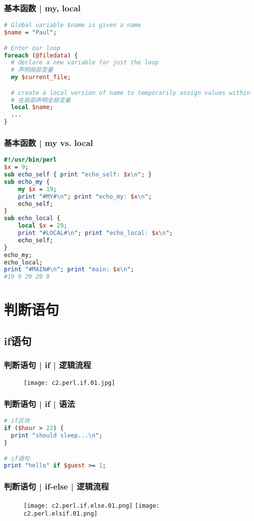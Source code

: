 \begin{frame}[fragile]
  \frametitle{基本函数 | \alert{my}, local}
\begin{lstlisting}[language=Perl]
# Global variable $name is given a name
$name = "Paul";

# Enter our loop
foreach (@filedata) {
  # declare a new variable for just the loop
  # 声明局部变量
  my $current_file;

  # create a local version of name to temporarily assign values within the loop to
  # 在局部声明全局变量
  local $name;
  ...
}
\end{lstlisting}
\end{frame}

\begin{frame}[fragile]
  \frametitle{基本函数 | my vs. local}
\begin{lstlisting}[language=Perl,basicstyle=\small\tt]
#!/usr/bin/perl
$x = 9;
sub echo_self { print "echo_self: $x\n"; }
sub echo_my {
    my $x = 19;
    print "#MY#\n"; print "echo_my: $x\n";
    echo_self;
}
sub echo_local {
    local $x = 29;
    print "#LOCAL#\n"; print "echo_local: $x\n";
    echo_self;
}
echo_my;
echo_local;
print "#MAIN#\n"; print "main: $x\n";
#19 9 29 29 9
\end{lstlisting}
\end{frame}

\section{判断语句}
\subsection{if语句}
\begin{frame}
  \frametitle{判断语句 | if | 逻辑流程}
  \begin{figure}
    \centering
    \texttt{[image: c2.perl.if.01.jpg]}
  \end{figure}
\end{frame}

\begin{frame}[fragile]
  \frametitle{判断语句 | if | \alert{语法}}
\begin{lstlisting}[language=Perl]
# if区块
if ($hour > 22) {
  print "should sleep...\n";
}

# if语句
print "hello" if $guest >= 1;
\end{lstlisting}
\end{frame}

\begin{frame}
  \frametitle{判断语句 | if-else | 逻辑流程}
  \begin{figure}
    \centering
    \texttt{[image: c2.perl.if.else.01.png]}
    \texttt{[image: c2.perl.elsif.01.png]}
  \end{figure}
\end{frame}

